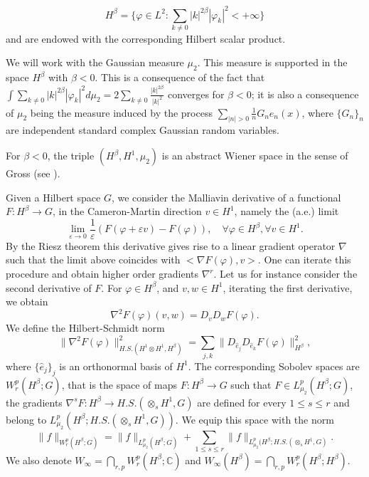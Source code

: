 \documentclass[11pt,leqno]{amsart}
\begin{document}
$$H^{\beta} =\Big\{  \varphi \in L^2  : \sum_{  k\neq 0} |k|^{2\beta} |\varphi_k |^2 < +\infty \Big\}$$
and are endowed with the corresponding Hilbert scalar product.





We will work with the Gaussian measure $\mu_2$. This measure is supported in the space $H^{\beta}$ with $\beta <0$. 
This is a consequence of the fact that
$\int \sum_{ k\neq 0}  |k|^{2\beta} |\varphi_k |^2 d\mu_2 =2\sum_{ k\neq 0} \frac{|k|^{2\beta}}{|k|^2} $ converges for $\beta <0$; 
it is also a consequence of $\mu_2$ being the measure induced by  the process 
$\sum_{|n|>0}  \frac{1}{n} G_n e_n (x)$, where $\{G_n\}_n$ are independent standard complex Gaussian random variables.

 For $\beta <0$,  the triple $(H^{\beta}, H^1, \mu_2 )$ is an abstract Wiener space in the sense of Gross (see \cite{G}).


Given a Hilbert space $G$, we consider the Malliavin derivative of a functional $F: H^{\beta} \rightarrow  G$,  in the Cameron-Martin direction $v\in H^1$, namely the (a.e.)  limit 
$$\lim_{\varepsilon \rightarrow 0} \frac{1}{\varepsilon} (F(\varphi +\varepsilon  v ) -F(\varphi )), %
\quad \forall  \varphi \in H^\beta, \forall  v\in H^1 .$$
By the Riesz theorem this derivative gives rise to a linear gradient operator $\nabla$ such that the limit above coincides with $<\nabla F (\varphi ), v>$. 
One can iterate this procedure and obtain higher order gradients $\nabla^r$. Let us for instance consider the second derivative of $F$. For $\varphi \in H^\beta$, and $v,w \in H^1$,
 iterating the first derivative, we obtain
$$ \nabla^2 F(\varphi)(v,w)= D_v D_w F(\varphi).$$
We define the Hilbert-Schmidt norm
$$\|\nabla^2 F(\varphi)\|^2_{H.S.(H^1 \otimes H^1 , H^\beta)} =\sum_{j,k} \|D_{\hat{e}_j} D_{\hat{e}_k} F(\varphi )\|^2_{H^\beta},$$
where $\{\hat{e}_j\}_j$ is an orthonormal basis of $H^1$. The corresponding Sobolev spaces are 
$W_r^p (H^\beta; G)$, that is 
 the space of maps $F: H^\beta \rightarrow G$ such that 
$F\in L_{\mu_2}^p (H^\beta ; G)$, the gradients $\nabla^s F : H^\beta \rightarrow H.S. (\otimes_s H^1 , G)$ are defined for every $1\leq s \leq r$ and belong to 
$L_{\mu_2}^p (H^\beta ; H.S. (\otimes_s H^1 , G))$. 
We equip this space with the norm
$$\|f\|_{W_r^p (H^\beta ; G)} = \|f \|_{L_{\mu_2}^p (H^\beta ; G) } + \sum_{1\leq s \leq r} \|f\|_{L_{\mu_2}^p (H^\beta ; H.S. (\otimes_s H^1 , G) }.$$
We also denote $W_{\infty} = \bigcap_{r,p} W_{r}^p (H^\beta ; \mathbb{C})$ 
 and $W_{\infty} (H^\beta) = \bigcap_{r,p} W_{r}^p (H^\beta ; H^\beta)$.
\end{document}
